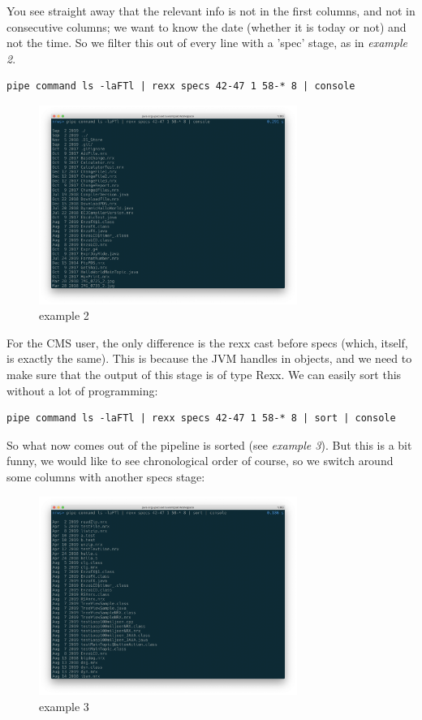 You see straight away that the relevant info is not in the first
columns, and not in consecutive columns; we want to know the date
(whether it is today or not) and not the time. So we filter this out
of every line with a 'spec' stage, as in \emph{example 2}.
\begin{lstlisting}
pipe command ls -laFTl | rexx specs 42-47 1 58-* 8 | console
\end{lstlisting}
\begin{figure}[h]
  \includegraphics[width=0.75\textwidth]{images/example2.png}
  \caption{example 2}
  \label{fig:example2}
\end{figure}
For the CMS user, the only difference is the rexx cast before specs
(which, itself, is exactly the same). This is because the JVM handles in objects, and we need to make sure that the output of this stage is of type Rexx. 
We can easily sort this without a lot of programming:
\begin{lstlisting}
pipe command ls -laFTl | rexx specs 42-47 1 58-* 8 | sort | console
\end{lstlisting}
So what now comes out of the pipeline is sorted (see \emph{example 3}).
But this is a bit funny, we would like to see chronological order of course, so we switch around some columns with another specs stage:
\begin{figure}[h]
  \includegraphics[width=0.75\textwidth]{images/example3.png}
  \caption{example 3}
  \label{fig:example3}
\end{figure}

